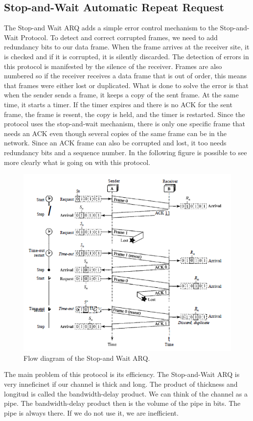 \documentclass[12pt,a4paper]{report}
\begin{document}
\subsection{Stop-and-Wait Automatic Repeat Request}
The Stop-and Wait ARQ adds a simple error control mechanism to the Stop-and-Wait Protocol. To detect and correct corrupted frames, we need to add redundancy bits to our data
frame. When the frame arrives at the receiver site, it is checked and if
it is corrupted, it is silently discarded. The detection of errors in this protocol is manifested
by the silence of the receiver. Frames are also numbered so if the
receiver receives a data frame that is out of order, this means that frames were either
lost or duplicated. What is done to solve the error is that when the sender sends a frame, it    keeps a copy of the sent frame. At the same time, it starts
a timer. If the timer expires and there is no ACK for the sent frame, the frame is resent, the
copy is held, and the timer is restarted. Since the protocol uses the stop-and-wait mechanism,
there is only one specific frame that needs an ACK even though several copies of
the same frame can be in the network. Since an ACK frame can also be corrupted and lost, it too needs redundancy bits
and a sequence number. In the following figure is possible to see more clearly what is going on with this protocol. 
\begin{figure}[H]
\begin{center}
\includegraphics[scale=1]{flowdiagram.PNG} 
\caption{Flow diagram of the Stop-and Wait ARQ.}
\end{center}
\end{figure}
The main problem of this protocol is its efficiency. The Stop-and-Wait ARQ is very inneficinet if our channel is thick and long. The product of thickness and longitud is called the bandwidth-delay product. We can think of the channel as a pipe. The
bandwidth-delay product then is the volume of the pipe in bits. The pipe is always there.
If we do not use it, we are inefficient. 
\end{document}
